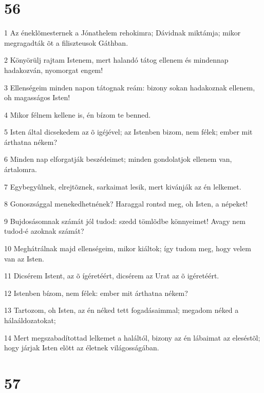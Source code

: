 \chapter{56}

\par 1 Az éneklõmesternek a Jónathelem rehokimra; Dávidnak miktámja; mikor megragadták õt a filiszteusok Gáthban.
\par 2 Könyörülj rajtam Istenem, mert halandó tátog ellenem és mindennap hadakozván, nyomorgat engem!
\par 3 Ellenségeim minden napon tátognak reám: bizony sokan hadakoznak ellenem, oh magasságos Isten!
\par 4 Mikor félnem kellene is, én bízom te benned.
\par 5 Isten által dicsekedem az õ igéjével; az Istenben bizom, nem félek; ember mit árthatna nékem?
\par 6 Minden nap elforgatják beszédeimet; minden gondolatjok ellenem van, ártalomra.
\par 7 Egybegyûlnek, elrejtõznek, sarkaimat lesik, mert kivánják az én lelkemet.
\par 8 Gonoszsággal menekedhetnének? Haraggal rontsd meg, oh Isten, a népeket!
\par 9 Bujdosásomnak számát jól tudod: szedd tömlõdbe könnyeimet! Avagy nem tudod-é azoknak számát?
\par 10 Meghátrálnak majd ellenségeim, mikor kiáltok; így tudom meg, hogy velem van az Isten.
\par 11 Dicsérem Istent, az õ ígéretéért, dicsérem az Urat az õ igéretéért.
\par 12 Istenben bízom, nem félek: ember mit árthatna nékem?
\par 13 Tartozom, oh Isten, az én néked tett fogadásaimmal; megadom néked a hálaáldozatokat;
\par 14 Mert megszabadítottad lelkemet a haláltól, bizony az én lábaimat az eleséstõl; hogy járjak Isten elõtt az életnek világosságában.

\chapter{57}

